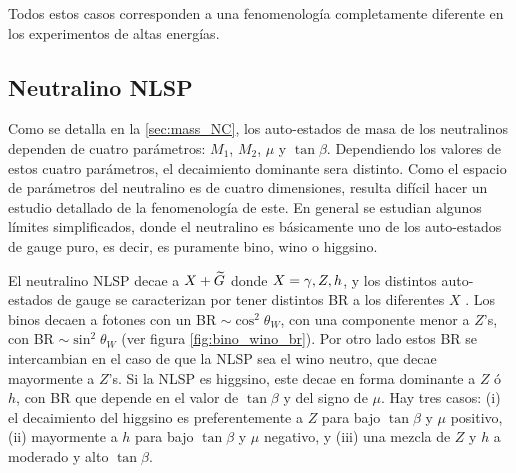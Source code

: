


Todos estos casos corresponden a una fenomenología completamente diferente en
los experimentos de altas energías.


\subsection{Neutralino NLSP}

Como se detalla en la \cref{sec:mass_NC}, los auto-estados de masa de los
neutralinos dependen de cuatro parámetros: $M_1$, $M_2$, $\mu$ y $\tan\beta$.
Dependiendo los valores de estos cuatro parámetros, el decaimiento dominante
sera distinto. Como el espacio de parámetros del neutralino es de cuatro
dimensiones, resulta difícil hacer un estudio detallado de la fenomenología de
este. En general se estudian algunos límites simplificados, donde el neutralino
es básicamente uno de los auto-estados de gauge puro, es decir, es puramente
bino, wino o higgsino.

El neutralino NLSP decae a $X + \widetilde{G}$ donde $X=\gamma,Z,h$, y los distintos
auto-estados de gauge se caracterizan por tener distintos BR a los diferentes $X$
\cite{Ruderman:2011vv}.
Los binos decaen a fotones con un BR $\sim \cos^2\theta_W$, con una componente
menor a $Z$'s, con BR $\sim \sin^2\theta_W$ (ver figura
\cref{fig:bino_wino_br}). Por otro lado estos BR se intercambian en el caso de
que la NLSP sea el wino neutro, que decae mayormente a $Z$'s. Si la NLSP es
higgsino, este decae en forma dominante a $Z$ ó $h$, con BR que depende en el
valor de $\tan\beta$ y del signo de $\mu$. Hay tres casos: (i) el decaimiento
del higgsino es preferentemente a $Z$ para bajo $\tan\beta$ y $\mu$ positivo,
(ii) mayormente a $h$ para bajo $\tan\beta$ y $\mu$ negativo, y (iii) una mezcla
de $Z$ y $h$ a moderado y alto $\tan\beta$.

